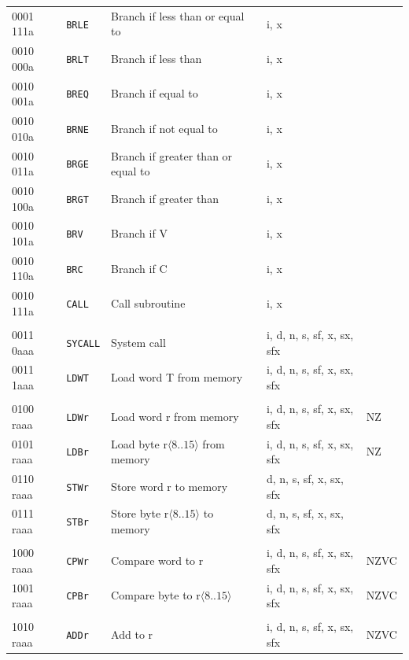 \documentclass[10pt,fleqn]{book}
\begin{document}
\begin{tabular}{ l l l l l }
0001 111a   & \verb|BRLE|    & Branch if less than or equal to             & i, x \\ 
0010 000a   & \verb|BRLT|    & Branch if less than                         & i, x \\
0010 001a   & \verb|BREQ|    & Branch if equal to                          & i, x \\ 
0010 010a   & \verb|BRNE|    & Branch if not equal to                      & i, x \\ 
0010 011a   & \verb|BRGE|    & Branch if greater than or equal to          & i, x \\ 
0010 100a   & \verb|BRGT|    & Branch if greater than                      & i, x \\ 
0010 101a   & \verb|BRV|     & Branch if V                                 & i, x \\ 
0010 110a   & \verb|BRC|     & Branch if C                                 & i, x \\ 
0010 111a   & \verb|CALL|    & Call subroutine                             & i, x \\ 
 \\
0011 0aaa   & \verb|SYCALL|  & System call                                 & i, d, n, s, sf, x, sx, sfx \\
0011 1aaa   & \verb|LDWT|    & Load word T from memory                     & i, d, n, s, sf, x, sx, sfx \\
 \\
0100 raaa   & \verb|LDWr|    & Load word r from memory                     & i, d, n, s, sf, x, sx, sfx  & NZ \\
0101 raaa   & \verb|LDBr|    & Load byte r$\langle8..15\rangle$ from memory& i, d, n, s, sf, x, sx, sfx  & NZ \\
0110 raaa   & \verb|STWr|    & Store word r to memory                      & d, n, s, sf, x, sx, sfx \\
0111 raaa   & \verb|STBr|    & Store byte r$\langle8..15\rangle$ to memory & d, n, s, sf, x, sx, sfx \\
\\
1000 raaa   & \verb|CPWr|    & Compare word to r                           & i, d, n, s, sf, x, sx, sfx  & NZVC \\
1001 raaa   & \verb|CPBr|    & Compare byte to r$\langle8..15\rangle$      & i, d, n, s, sf, x, sx, sfx  & NZVC \\
 \\
1010 raaa   & \verb|ADDr|    & Add to r                                    & i, d, n, s, sf, x, sx, sfx  & NZVC \\

\end{tabular}
\end{document}
